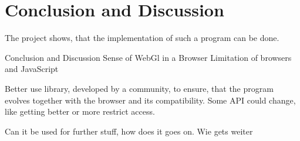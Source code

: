\chapter{Conclusion and Discussion }


The project shows, that the implementation of such a program can be done.



Conclusion and Discussion 
Sense of WebGl in a Browser
Limitation of browsers and JavaScript




Better use library, developed by a community, to ensure, that the program evolves together with the browser and its compatibility. Some API could change, like getting better or more restrict access.

Can it be used for further stuff, how does it goes on. Wie gets weiter
